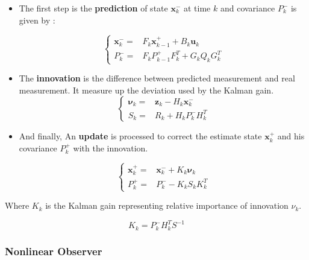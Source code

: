 \documentclass[conference]{IEEEtran}
\begin{document}
\begin{itemize}
\item The first step is the \textbf{prediction} of state $\textbf{x}^-_{k}$ at time $k$ and covariance $P^-_{k}$ is given by :

\begin{equation}
\left\{ \begin{array}{cl}
\textbf{x}^-_{k} = & F_{k}\textbf{x}^+_{k-1} + B_{k}\textbf{u}_{k} \\
P^-_{k} = & F_{k}P^+_{k-1}F^T_{k}+G_{k}Q_{k}G^T_{k}
\end{array}
\right.
\end{equation}

\item The \textbf{innovation} is the difference between predicted measurement and real measurement. It measure up the deviation used by the Kalman gain.
\begin{equation}
\left\{ \begin{array}{cl}
\boldsymbol\nu_{k} = & \textbf{z}_{k}-H_{k}\textbf{x}^-_{k} \\
S_{k} = & R_{k} +H_{k}P^-_{k}H^T_{k}
\end{array}
\right.
\end{equation}

\item And finally, An \textbf{update} is processed to correct the estimate state $\textbf{x}^+_{k} $ and his covariance $P^+_{k}$ with the innovation.

\begin{equation}
\left\{ \begin{array}{cl}
\textbf{x}^+_{k} = & \textbf{x}^-_{k} + K_{k}\boldsymbol\nu_{k} \\
P^+_{k} = &P^-_{k} - K_{k}S_{k}K^T_{k}
\end{array}
\right.
\end{equation}

\end{itemize}

Where $K_k$ is the Kalman gain  representing relative importance of innovation  $\nu_{k}$. 

\begin{equation}
K_{k}=P^-_{k}H^T_{k}S^{-1}
\end{equation}





\subsubsection{Nonlinear Observer}
\end{document}

